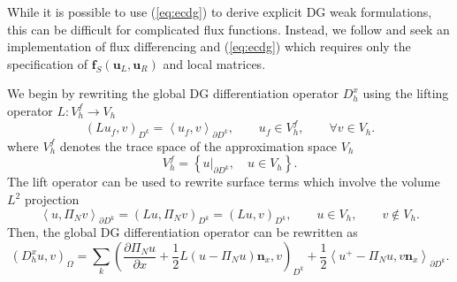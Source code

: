 \documentclass[preprint,10pt]{article}
\theoremstyle{definition}
\theoremstyle{lemma}
\theoremstyle{theorem}
\theoremstyle{assumption}
\newcommand{\pd}[2]{\frac{\partial#1}{\partial#2}}
\newcommand{\LRp}[1]{\left( #1 \right)}
\newcommand{\LRa}[1]{\left\langle #1 \right\rangle}
\newcommand{\LRc}[1]{\left\{ #1 \right\}}
\newcommand{\note}[1]{{\color{blue}{#1}}}
\begin{document}
While it is possible to use (\ref{eq:ecdg}) to derive explicit DG weak formulations, this can be difficult for complicated flux functions.  Instead, we follow \cite{gassner2016split, chen2017entropy} and seek an implementation of flux differencing and (\ref{eq:ecdg}) which requires only the specification of $\bm{f}_S(\bm{u}_L,\bm{u}_R)$ and local matrices.  

We begin by rewriting the global DG differentiation operator $D^x_h$ using the lifting operator  ${L}: V_h^f\rightarrow V_h$
\[
\LRp{{L} u_f,v}_{D^k} = \LRa{u_f,v}_{\partial D^k}, \qquad u_f \in V_h^f, \qquad \forall v\in V_h.
\]
where $V_h^f$ denotes the trace space of the approximation space $V_h$
\[
V_h^f = \LRc{ \left.u\right|_{\partial D^k}, \quad u \in V_h}.
\]
The lift operator can be used to rewrite surface terms which involve the volume $L^2$ projection
\[
\LRa{u,\Pi_Nv}_{\partial D^k} = \LRp{Lu,\Pi_N v}_{D^k} = \LRp{Lu,v}_{D^k}, \qquad u\in V_h, \qquad v\not\in V_h.  
\]
Then, the global DG differentiation operator can be rewritten as 
\begin{equation}
\LRp{D^x_h u,v}_{\Omega} = \sum_k \LRp{\pd{ \Pi_N u}{x} + \frac{1}{2}L\LRp{u-\Pi_N u}\bm{n}_x,v}_{D^k} + \frac{1}{2}{\LRa{{u^+ - \Pi_N u}, v\bm{n}_x}_{\partial D^k}}.
\label{eq:dgd_globalimplement}
\end{equation}

%
%
%
%
%
%
\end{document}
